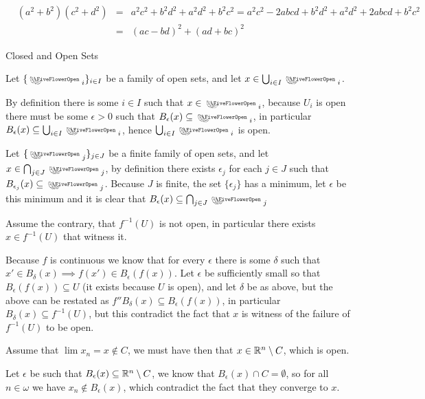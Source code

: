 \begin{cExercise}[][][author][4]
	\begin{align*}
		&(a^2+b^2)(c^2+d^2)&=&a^2c^2+b^2d^2+a^2d^2+b^2c^2=a^2c^2-2abcd+b^2d^2+a^2d^2+2abcd+b^2c^2\\
		&&=&(ac-bd)^2+(ad+bc)^2
	\end{align*}
\end{cExercise}
{\Large Closed and Open Sets}
\begin{cExercise}[][][author][1]
	Let $\{\flower_i\}_{i\in I}$ be a family of open sets, and let $x\in \bigcup_{i\in I}\flower_i$.
	
	By definition there is some $i\in I$ such that $x\in \flower_i$, because $U_i$ is open there must be some $\epsilon>0$ such that $B_\epsilon(x)\subseteq \flower_i$, in particular $B_\epsilon(x)\subseteq \bigcup_{i\in I}\flower_i$, hence $\bigcup_{i\in I}\flower_i$ is open.
	
	Let $\{\flower_j\}_{j\in J}$ be a finite family of open sets, and let $x\in \bigcap_{j\in J}\flower_j$, by definition there exists $\epsilon_j$ for each $j\in J$ such that $B_{\epsilon_j}(x)\subseteq \flower_j$. Because $J$ is finite, the set $\{\epsilon_j\}$ has a minimum, let $\epsilon$ be this minimum and it is clear that $B_\epsilon(x)\subseteq \bigcap_{j\in J}\flower_j$
\end{cExercise}
\begin{cExercise}
	Assume the contrary, that $f^{-1}(U)$ is not open, in particular there exists $x\in f^{-1}(U)$ that witness it.
	
	Because $f$ is continuous we know that for every $\epsilon$ there is some $\delta$ such that $x'\in B_\delta(x)\implies f(x')\in B_\epsilon(f(x))$. Let $\epsilon$ be sufficiently small so that $B_\epsilon(f(x))\subseteq U$ (it exists because $U$ is open), and let $\delta$ be as above, but the above can be restated as $f''B_\delta(x)\subseteq B_\epsilon (f(x))$, in particular $B_\delta(x)\subseteq f^{-1}(U)$, but this contradict the fact that $x$ is witness of the failure of $f^{-1}(U)$ to be open.
\end{cExercise}
\begin{cExercise}
	Assume that $\lim x_n=x\notin C$, we must have then that $x\in \mathbb R^n\setminus C$, which is open.
	
	Let $\epsilon$ be such that $B_\epsilon(x)\subseteq \mathbb R^n\setminus C$, we know that $B_\epsilon(x)\cap C=\emptyset$, so for all $n\in\omega$ we have $x_n\notin B_\epsilon(x)$, which contradict the fact that they converge to $x$.
\end{cExercise}





